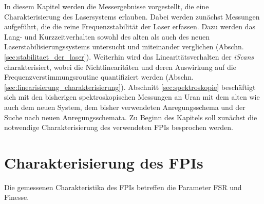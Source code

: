 In diesem Kapitel werden die Messergebnisse vorgestellt, die eine
Charakterisierung des Lasersystems erlauben. Dabei werden zunächst Messungen
aufgeführt, die die reine Frequenzstabilität der Laser erfassen. Dazu werden
das Lang- und Kurzzeitverhalten sowohl des alten als auch des neuen
Laserstabilisierungssystems untersucht und miteinander verglichen (Abschn.
\ref{sec:stabilitaet_der_laser}).
Weiterhin wird das Linearitätsverhalten der \textit{iScans} charakterisiert, wobei die
Nichtlinearitäten und deren Auswirkung auf die
Frequenzverstimmungsroutine quantifiziert werden (Abschn.
\ref{sec:linearisierung_charakterisierung}). Abschnitt \ref{sec:spektroskopie} beschäftigt
sich mit den bisherigen spektroskopischen Messungen an Uran mit dem alten wie
auch dem neuen System, dem bisher verwendeten Anregungsschema und der Suche nach
neuen Anregungsschemata.
Zu Beginn des Kapitels soll zunächst die notwendige Charakterisierung
des verwendeten FPIs besprochen werden.

\section{Charakterisierung des FPIs}\label{sec:charakterisierung_FPI}
Die gemessenen Charakteristika des FPIs betreffen die Parameter FSR und Finesse.

